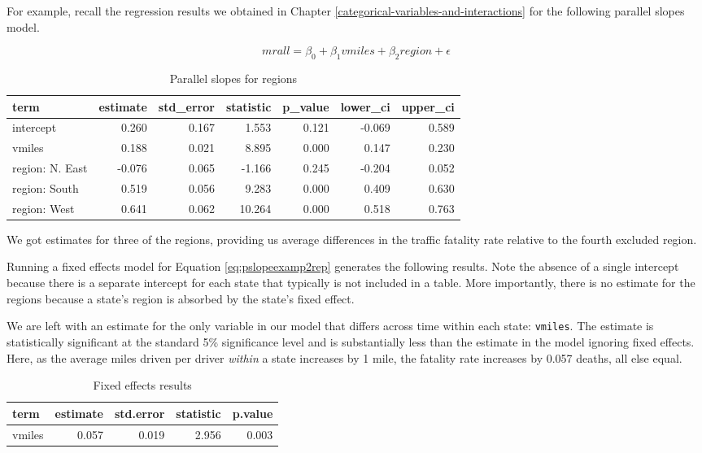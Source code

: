 \documentclass[
]{book}
\begin{document}
For example, recall the regression results we obtained in Chapter \ref{categorical-variables-and-interactions} for the following parallel slopes model.

\begin{equation}
mrall = \beta_0 + \beta_1vmiles + \beta_2region + \epsilon
\label{eq:pslopeexamp2rep}
\end{equation}

\begin{table}

\caption{\label{tab:psloperesults2rep}Parallel slopes for regions}
\centering
\begin{tabular}[t]{l|r|r|r|r|r|r}
\hline
term & estimate & std\_error & statistic & p\_value & lower\_ci & upper\_ci\\
\hline
intercept & 0.260 & 0.167 & 1.553 & 0.121 & -0.069 & 0.589\\
\hline
vmiles & 0.188 & 0.021 & 8.895 & 0.000 & 0.147 & 0.230\\
\hline
region: N. East & -0.076 & 0.065 & -1.166 & 0.245 & -0.204 & 0.052\\
\hline
region: South & 0.519 & 0.056 & 9.283 & 0.000 & 0.409 & 0.630\\
\hline
region: West & 0.641 & 0.062 & 10.264 & 0.000 & 0.518 & 0.763\\
\hline
\end{tabular}
\end{table}

We got estimates for three of the regions, providing us average differences in the traffic fatality rate relative to the fourth excluded region.

Running a fixed effects model for Equation \eqref{eq:pslopeexamp2rep} generates the following results. Note the absence of a single intercept because there is a separate intercept for each state that typically is not included in a table. More importantly, there is no estimate for the regions because a state's region is absorbed by the state's fixed effect.

We are left with an estimate for the only variable in our model that differs across time within each state: \texttt{vmiles}. The estimate is statistically significant at the standard 5\% significance level and is substantially less than the estimate in the model ignoring fixed effects. Here, as the average miles driven per driver \emph{within} a state increases by 1 mile, the fatality rate increases by 0.057 deaths, all else equal.

\begin{table}

\caption{\label{tab:unnamed-chunk-64}Fixed effects results}
\centering
\begin{tabular}[t]{l|r|r|r|r}
\hline
term & estimate & std.error & statistic & p.value\\
\hline
vmiles & 0.057 & 0.019 & 2.956 & 0.003\\
\hline
\end{tabular}
\end{table}
\end{document}
